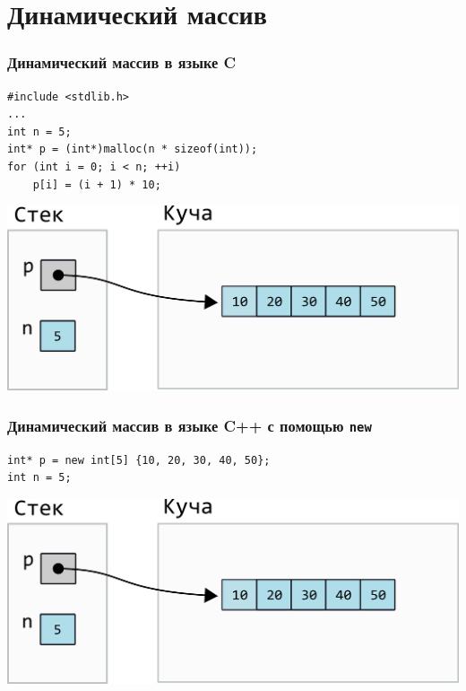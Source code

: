 \documentclass[10pt,pdf,hyperref={unicode}]{beamer}
\begin{document}
\section{Динамический массив} 

\begin{frame}[fragile]
\frametitle{Динамический массив в языке C} 
\begin{lstlisting}
#include <stdlib.h>
...
int n = 5;
int* p = (int*)malloc(n * sizeof(int));
for (int i = 0; i < n; ++i)
    p[i] = (i + 1) * 10;
\end{lstlisting}
\begin{center}
\includegraphics[scale=0.6]{images/dynamic_array/dynamic_array.png}
\end{center}
\end{frame}


\begin{frame}[fragile]
\frametitle{Динамический массив в языке C++ с помощью \texttt{new}} 
\begin{lstlisting}
int* p = new int[5] {10, 20, 30, 40, 50};
int n = 5;
\end{lstlisting}
\begin{center}
\includegraphics[scale=0.6]{images/dynamic_array/dynamic_array.png}
\end{center}
\end{frame}
\end{document}
